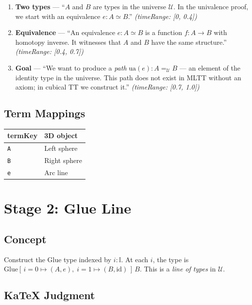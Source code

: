 \documentclass[11pt,a4paper]{article}
\begin{document}
\begin{enumerate}
  \item \textbf{Two types} — ``$A$ and $B$ are types in the universe $\mathcal{U}$.
    In the univalence proof, we start with an equivalence $e : A \simeq B$.''
    \textit{(timeRange: [0, 0.4])}
  \item \textbf{Equivalence} — ``An equivalence $e : A \simeq B$ is a function
    $f : A \to B$ with homotopy inverse. It witnesses that $A$ and $B$ have the
    same structure.''
    \textit{(timeRange: [0.4, 0.7])}
  \item \textbf{Goal} — ``We want to produce a \emph{path} $\mathrm{ua}(e) : A
    =_{\mathcal{U}} B$ — an element of the identity type in the universe. This
    path does not exist in MLTT without an axiom; in cubical TT we construct it.''
    \textit{(timeRange: [0.7, 1.0])}
\end{enumerate}

\subsection{Term Mappings}
\begin{center}
\begin{tabular}{ll}
\toprule \textbf{termKey} & \textbf{3D object} \\\midrule
\texttt{A} & Left sphere \\ \texttt{B} & Right sphere \\
\texttt{e} & Arc line \\ \bottomrule
\end{tabular}
\end{center}

\section{Stage 2: Glue Line}

\subsection{Concept}

Construct the Glue type indexed by $i : \mathbb{I}$.  At each $i$, the type is
$\mathrm{Glue}[\,i{=}0\mapsto(A,e),\;i{=}1\mapsto(B,\mathrm{id})\,]\,B$.
This is a \emph{line of types} in $\mathcal{U}$.

\subsection{KaTeX Judgment}
\end{document}
